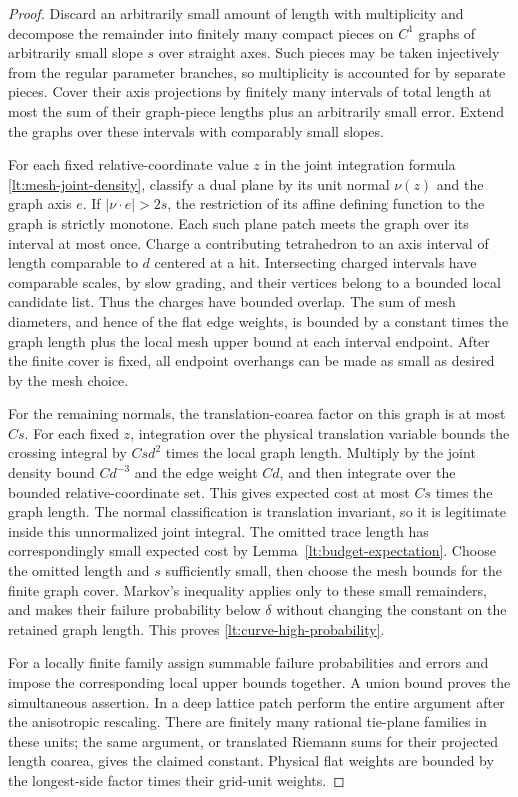 \begin{proof}
Discard an arbitrarily small amount of length with multiplicity
and decompose the remainder into finitely many compact pieces on
$C^1$ graphs of arbitrarily small slope $s$ over straight axes.
Such pieces may be taken injectively from the regular parameter
branches, so multiplicity is accounted for by separate pieces.
Cover their axis projections by finitely many intervals of total
length at most the sum of their graph-piece lengths plus an
arbitrarily small error.  Extend the graphs over these intervals
with comparably small slopes.

For each fixed relative-coordinate value $z$ in the joint
integration formula \eqref{lt:mesh-joint-density}, classify a dual
plane by its unit normal $\nu(z)$ and the graph axis $e$.  If
$|\nu\cdot e|>2s$, the restriction of its affine defining function
to the graph is strictly monotone.  Each such plane patch meets
the graph over its interval at most once.  Charge a contributing
tetrahedron to an axis interval of length comparable to $d$
centered at a hit.  Intersecting charged intervals have comparable
scales, by slow grading, and their vertices belong to a bounded
local candidate list.  Thus the charges have bounded overlap.
The sum of mesh diameters, and hence of the flat edge weights,
is bounded by a constant times the graph length plus the local
mesh upper bound at each interval endpoint.  After the finite
cover is fixed, all endpoint overhangs can be made as small as
desired by the mesh choice.

For the remaining normals, the translation-coarea factor on this
graph is at most $Cs$.  For each fixed $z$, integration over the
physical translation variable bounds the crossing integral by
$Cs d^2$ times the local graph length.  Multiply by the joint
density bound $Cd^{-3}$ and the edge weight $Cd$, and then
integrate over the bounded relative-coordinate set.  This gives
expected cost at most $Cs$ times the graph length.  The normal
classification is translation invariant, so it is legitimate
inside this unnormalized joint integral.  The omitted trace length has correspondingly
small expected cost by Lemma~\ref{lt:budget-expectation}.  Choose the omitted length
and $s$ sufficiently small, then choose the mesh bounds for the
finite graph cover.  Markov's inequality applies only to these
small remainders, and makes their failure probability below
$\delta$ without changing the constant on the retained graph
length.  This proves \eqref{lt:curve-high-probability}.

For a locally finite family assign summable failure probabilities
and errors and impose the corresponding local upper bounds
together.  A union bound proves the simultaneous assertion.
In a deep lattice patch perform the entire argument after the
anisotropic rescaling.  There are finitely many rational tie-plane
families in these units; the same argument, or translated Riemann
sums for their projected length coarea, gives the claimed constant.
Physical flat weights are bounded by the longest-side factor
times their grid-unit weights.
\end{proof}

